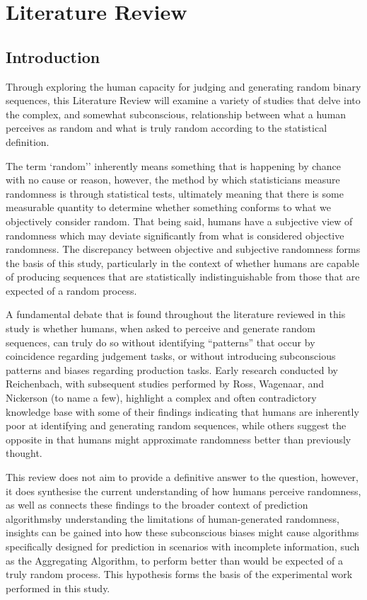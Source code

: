 \section{Literature Review}\label{section:literature_review}
\subsection{Introduction}
Through exploring the human capacity for judging and generating random binary sequences, this Literature Review will examine a variety of studies that delve into the complex, and somewhat subconscious, relationship between what a human perceives as random and what is truly random according to the statistical definition.

The term `random'' inherently means something that is happening by chance with no cause or reason, however, the method by which statisticians measure randomness is through statistical tests, ultimately meaning that there is some measurable quantity to determine whether something conforms to what we objectively consider random. That being said, humans have a subjective view of randomness which may deviate significantly from what is considered objective randomness. The discrepancy between objective and subjective randomness forms the basis of this study, particularly in the context of whether humans are capable of producing sequences that are statistically indistinguishable from those that are expected of a random process.

A fundamental debate that is found throughout the literature reviewed in this study is whether humans, when asked to perceive and generate random sequences, can truly do so without identifying ``patterns'' that  occur by coincidence regarding judgement tasks, or without introducing subconscious patterns and biases regarding production tasks. Early research conducted by Reichenbach, with subsequent studies performed by Ross, Wagenaar, and Nickerson (to name a few), highlight a complex and often contradictory knowledge base with some of their findings indicating that humans are inherently poor at identifying and generating random sequences, while others suggest the opposite in that humans might approximate randomness better than previously thought.

This review does not aim to provide a definitive answer to the question, however, it does synthesise the current understanding of how humans perceive randomness, as well as connects these findings to the broader context of prediction algorithms\textemdash{}by understanding the limitations of human-generated randomness, insights can be gained into how these subconscious biases might cause algorithms specifically designed for prediction in scenarios with incomplete information, such as the Aggregating Algorithm, to perform better than would be expected of a truly random process. This hypothesis forms the basis of the experimental work performed in this study.

